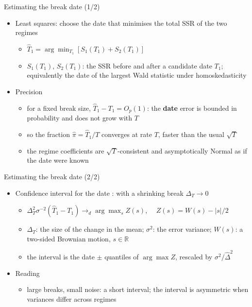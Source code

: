 \begin{frame}{Estimating the break date (1/2)}
\itemsize{\small}
\begin{itemize}
    \item Least squares: choose the date that minimises the total SSR of the two regimes
    \begin{itemize}
        \item $\hat T_1 = \arg\min_{T_1} [S_1(T_1) + S_2(T_1)]$
        \item $S_1(T_1)$, $S_2(T_1)$: the SSR before and after a candidate date $T_1$; equivalently the date of the largest Wald statistic under homoskedasticity
    \end{itemize}
    \item Precision 
    \begin{itemize}
        \item for a fixed break size, $\hat T_1 - T_1 = O_p(1)$: the \textbf{date} error is bounded in probability and does not grow with $T$
        \item so the fraction $\hat\pi = \hat T_1/T$ converges at rate $T$, faster than the usual $\sqrt T$
        \item the regime coefficients are $\sqrt T$-consistent and asymptotically Normal as if the date were known
    \end{itemize}
\end{itemize}
\end{frame}

\begin{frame}{Estimating the break date (2/2)}
\itemsize{\small}
\begin{itemize}
    \item Confidence interval for the date : with a shrinking break $\Delta_T \to 0$
    \begin{itemize}
        \item $\Delta_T^2\sigma^{-2}(\hat T_1 - T_1) \to_d \arg\max_s Z(s)$, $\quad Z(s) = W(s) - |s|/2$
        \item $\Delta_T$: the size of the change in the mean; $\sigma^2$: the error variance; $W(s)$: a two-sided Brownian motion, $s \in \mathbb R$
        \item the interval is the date $\pm$ quantiles of $\arg\max Z$, rescaled by $\sigma^2/\hat\Delta^2$
    \end{itemize}
    \item Reading
    \begin{itemize}
        \item large breaks, small noise: a short interval; the interval is asymmetric when variances differ across regimes
    \end{itemize}
\end{itemize}
\end{frame}

